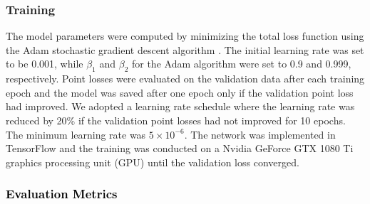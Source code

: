 \documentclass[times,review,preprint,authoryear]{elsarticle}
\begin{document}
\subsubsection{Training} The model parameters were computed by minimizing the total loss function using the Adam stochastic gradient descent algorithm \citep{adam}. The initial learning rate was set to be 0.001, while $\beta_1$ and $\beta_2$ for the Adam algorithm were set to 0.9 and 0.999, respectively. Point losses were evaluated on the validation data after each training epoch and the model was saved after one epoch only if the validation point loss had improved. We adopted a learning rate schedule where the learning rate was reduced by 20\% if the validation point losses had not improved for 10 epochs. The minimum learning rate was $5\times10^{-6}$. The network was implemented in TensorFlow and the training was conducted on a Nvidia GeForce GTX 1080 Ti graphics processing unit (GPU) until the validation loss converged.
\textcolor{black}{
\subsubsection{Evaluation Metrics}}
\label{appendix:metrics}
\end{document}
